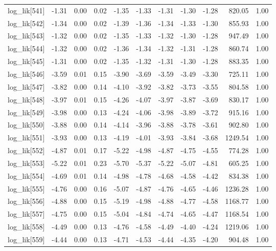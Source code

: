 \begin{table}[ht]
\begin{tabular}{rrrrrrrrrrr}
  log\_lik[541] & -1.31 & 0.00 & 0.02 & -1.35 & -1.33 & -1.31 & -1.30 & -1.28 & 820.05 & 1.00 \\ 
  log\_lik[542] & -1.34 & 0.00 & 0.02 & -1.39 & -1.36 & -1.34 & -1.33 & -1.30 & 855.93 & 1.00 \\ 
  log\_lik[543] & -1.32 & 0.00 & 0.02 & -1.35 & -1.33 & -1.32 & -1.30 & -1.28 & 947.49 & 1.00 \\ 
  log\_lik[544] & -1.32 & 0.00 & 0.02 & -1.36 & -1.34 & -1.32 & -1.31 & -1.28 & 860.74 & 1.00 \\ 
  log\_lik[545] & -1.31 & 0.00 & 0.02 & -1.35 & -1.32 & -1.31 & -1.30 & -1.28 & 883.35 & 1.00 \\ 
  log\_lik[546] & -3.59 & 0.01 & 0.15 & -3.90 & -3.69 & -3.59 & -3.49 & -3.30 & 725.11 & 1.00 \\ 
  log\_lik[547] & -3.82 & 0.00 & 0.14 & -4.10 & -3.92 & -3.82 & -3.73 & -3.55 & 804.58 & 1.00 \\ 
  log\_lik[548] & -3.97 & 0.01 & 0.15 & -4.26 & -4.07 & -3.97 & -3.87 & -3.69 & 830.17 & 1.00 \\ 
  log\_lik[549] & -3.98 & 0.00 & 0.13 & -4.24 & -4.06 & -3.98 & -3.89 & -3.72 & 915.16 & 1.00 \\ 
  log\_lik[550] & -3.88 & 0.00 & 0.14 & -4.14 & -3.96 & -3.88 & -3.78 & -3.61 & 902.80 & 1.00 \\ 
  log\_lik[551] & -3.93 & 0.00 & 0.13 & -4.19 & -4.01 & -3.93 & -3.84 & -3.68 & 1249.54 & 1.00 \\ 
  log\_lik[552] & -4.87 & 0.01 & 0.17 & -5.22 & -4.98 & -4.87 & -4.75 & -4.55 & 774.28 & 1.00 \\ 
  log\_lik[553] & -5.22 & 0.01 & 0.23 & -5.70 & -5.37 & -5.22 & -5.07 & -4.81 & 605.25 & 1.00 \\ 
  log\_lik[554] & -4.69 & 0.01 & 0.14 & -4.98 & -4.78 & -4.68 & -4.58 & -4.42 & 834.38 & 1.00 \\ 
  log\_lik[555] & -4.76 & 0.00 & 0.16 & -5.07 & -4.87 & -4.76 & -4.65 & -4.46 & 1236.28 & 1.00 \\ 
  log\_lik[556] & -4.88 & 0.00 & 0.15 & -5.19 & -4.98 & -4.88 & -4.77 & -4.58 & 1168.77 & 1.00 \\ 
  log\_lik[557] & -4.75 & 0.00 & 0.15 & -5.04 & -4.84 & -4.74 & -4.65 & -4.47 & 1168.54 & 1.00 \\ 
  log\_lik[558] & -4.49 & 0.00 & 0.13 & -4.76 & -4.58 & -4.49 & -4.40 & -4.24 & 1219.06 & 1.00 \\ 
  log\_lik[559] & -4.44 & 0.00 & 0.13 & -4.71 & -4.53 & -4.44 & -4.35 & -4.20 & 904.48 & 1.00 \\ 

\end{tabular}
\end{table}
